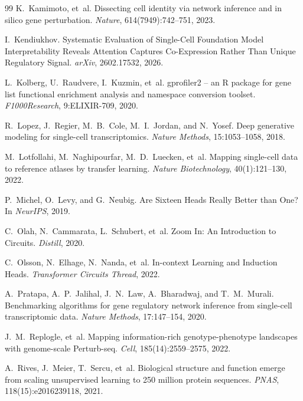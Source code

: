 \documentclass[11pt]{article}
\begin{document}
\begin{thebibliography}{99}
K.~Kamimoto, et~al.
\newblock Dissecting cell identity via network inference and in silico gene perturbation.
\newblock \emph{Nature}, 614(7949):742--751, 2023.

I.~Kendiukhov.
\newblock Systematic Evaluation of Single-Cell Foundation Model Interpretability Reveals Attention Captures Co-Expression Rather Than Unique Regulatory Signal.
\newblock \emph{arXiv}, 2602.17532, 2026.

L.~Kolberg, U.~Raudvere, I.~Kuzmin, et~al.
\newblock gprofiler2 -- an R package for gene list functional enrichment analysis and namespace conversion toolset.
\newblock \emph{F1000Research}, 9:ELIXIR-709, 2020.

R.~Lopez, J.~Regier, M.~B.~Cole, M.~I.~Jordan, and N.~Yosef.
\newblock Deep generative modeling for single-cell transcriptomics.
\newblock \emph{Nature Methods}, 15:1053--1058, 2018.

M.~Lotfollahi, M.~Naghipourfar, M.~D.~Luecken, et~al.
\newblock Mapping single-cell data to reference atlases by transfer learning.
\newblock \emph{Nature Biotechnology}, 40(1):121--130, 2022.

P.~Michel, O.~Levy, and G.~Neubig.
\newblock Are Sixteen Heads Really Better than One?
\newblock In \emph{NeurIPS}, 2019.

C.~Olah, N.~Cammarata, L.~Schubert, et~al.
\newblock Zoom In: An Introduction to Circuits.
\newblock \emph{Distill}, 2020.

C.~Olsson, N.~Elhage, N.~Nanda, et~al.
\newblock In-context Learning and Induction Heads.
\newblock \emph{Transformer Circuits Thread}, 2022.

A.~Pratapa, A.~P.~Jalihal, J.~N.~Law, A.~Bharadwaj, and T.~M.~Murali.
\newblock Benchmarking algorithms for gene regulatory network inference from single-cell transcriptomic data.
\newblock \emph{Nature Methods}, 17:147--154, 2020.

J.~M.~Replogle, et~al.
\newblock Mapping information-rich genotype-phenotype landscapes with genome-scale {Perturb-seq}.
\newblock \emph{Cell}, 185(14):2559--2575, 2022.

A.~Rives, J.~Meier, T.~Sercu, et~al.
\newblock Biological structure and function emerge from scaling unsupervised learning to 250 million protein sequences.
\newblock \emph{PNAS}, 118(15):e2016239118, 2021.


\end{thebibliography}
\end{document}
